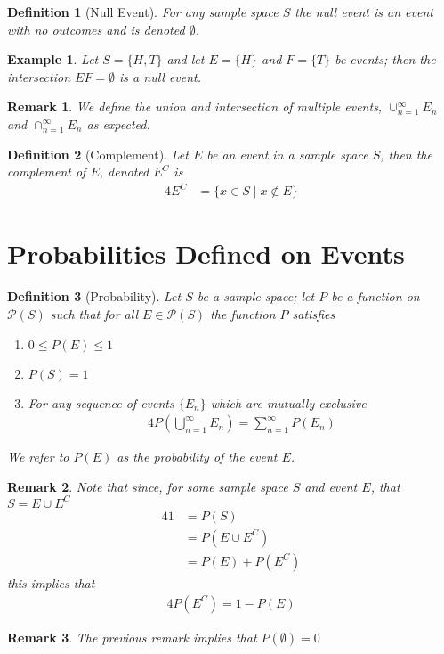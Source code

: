 \documentclass[11pt, oneside]{book}   	%
\newtheorem{definition}{Definition}
\newtheorem{example}{Example}
\newtheorem{remark}{Remark}
\begin{document}
\begin{definition}[Null Event]
	For any sample space $S$ the null event is an event with no outcomes and is denoted $\emptyset$.
\end{definition}

\begin{example}
	Let $S=\{H, T\}$ and let $E=\{H\}$ and $F=\{T\}$ be events; then the intersection $EF=\emptyset$ is a null event. 
\end{example}

\begin{remark}
	We define the union and intersection of multiple events, $\cup_{n=1}^\infty E_n$ and $\cap_{n=1}^\infty E_n$ as expected. 
\end{remark}

\begin{definition}[Complement]
	Let $E$ be an event in a sample space $S$, then the complement of $E$, denoted $E^C$ is 
	\begin{alignat}{4}
		E^C&=\{x\in S\mid x\not\in E\}
	\end{alignat}
\end{definition}

\section{Probabilities Defined on Events}

\begin{definition}[Probability]
	Let $S$ be a sample space; let $P$ be a function on $\mathcal{P}(S)$ such that for all $E\in\mathcal{P}(S)$ the function $P$ satisfies
	\begin{enumerate}
		\item $0\leq P(E)\leq 1$
		\item $P(S)=1$
		\item For any sequence of events $\{E_n\}$ which are mutually exclusive 
			\begin{alignat}{4}
				P\left(\bigcup_{n=1}^\infty E_n\right)=\sum_{n=1}^\infty P(E_n)
			\end{alignat}
	\end{enumerate}
	We refer to $P(E)$ as the probability of the event $E$. 
\end{definition}

\begin{remark}
	Note that since, for some sample space $S$ and event $E$, that $S=E\cup E^C$ 
	\begin{alignat}{4}
		1&=P(S) \\
			&=P\left(E\cup E^C\right) \\
			&=P(E)+P\left(E^C\right)
	\end{alignat}
	this implies that
	\begin{alignat}{4}
		P\left(E^C\right)=1-P(E)
	\end{alignat}
\end{remark}

\begin{remark}
	The previous remark implies that $P(\emptyset)=0$
\end{remark}
\end{document}
